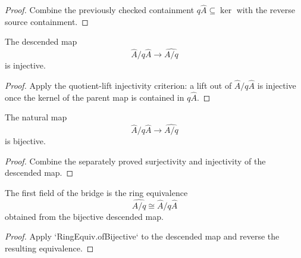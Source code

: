\begin{proof}
  Combine the previously checked containment \(q\widehat A\subseteq\ker\)
  with the reverse source containment.
\end{proof}

\begin{lemma}
  \label{lem:completed_quotient_to_quotient_completion_injective}
  The descended map
  \[
    \widehat A/q\widehat A\to\widehat{A/q}
  \]
  is injective.
\end{lemma}

\begin{proof}
  Apply the quotient-lift injectivity criterion: a lift out of
  \(\widehat A/q\widehat A\) is injective once the kernel of the parent map is
  contained in \(q\widehat A\).
\end{proof}

\begin{lemma}
  \label{lem:completed_quotient_to_quotient_completion_bijective_source}
  The natural map
  \[
    \widehat A/q\widehat A\to\widehat{A/q}
  \]
  is bijective.
\end{lemma}

\begin{proof}
  Combine the separately proved surjectivity and injectivity of the descended
  map.
\end{proof}

\begin{definition}
  \label{def:quotient_completion_equiv_source}
  The first field of the bridge is the ring equivalence
  \[
    \widehat{A/q}\cong \widehat A/q\widehat A
  \]
  obtained from the bijective descended map.
\end{definition}

\begin{proof}
  Apply `RingEquiv.ofBijective` to the descended map and reverse the resulting
  equivalence.
\end{proof}

